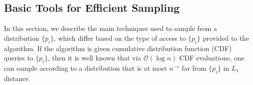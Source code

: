 






\subsection{Basic Tools for Efficient Sampling}
\label{sec:basic_tools_for_efficient_sampling}
In this section, we describe the main techniques used to sample from a distribution $\{ p_i\}$,
which differ based on the type of access to $\{p_i\}$ provided to the algorithm.
If the algorithm is given cumulative distribution function (CDF) queries to $\{p_i\}$,
then it is well known that via $\mathcal O(\log n)$ CDF evaluations, one can sample according
to a distribution that is at most $n^{-c}$ far from $\{p_i\}$ in $L_1$ distance.


